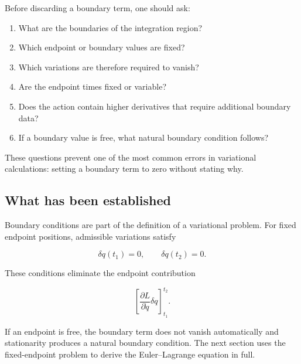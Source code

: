 Before discarding a boundary term, one should ask:

\begin{enumerate}
    \item What are the boundaries of the integration region?
    \item Which endpoint or boundary values are fixed?
    \item Which variations are therefore required to vanish?
    \item Are the endpoint times fixed or variable?
    \item Does the action contain higher derivatives that require additional boundary data?
    \item If a boundary value is free, what natural boundary condition follows?
\end{enumerate}

These questions prevent one of the most common errors in variational calculations: setting a boundary term to zero without stating why.

\subsection{What has been established}

Boundary conditions are part of the definition of a variational problem. For fixed endpoint positions, admissible variations satisfy

\[
\delta q(t_{1})=0,
\qquad
\delta q(t_{2})=0.
\]

These conditions eliminate the endpoint contribution

\[
\left[
\frac{\partial L}{\partial\dot q}\delta q
\right]_{t_{1}}^{t_{2}}.
\]

If an endpoint is free, the boundary term does not vanish automatically and stationarity produces a natural boundary condition. The next section uses the fixed-endpoint problem to derive the Euler--Lagrange equation in full.